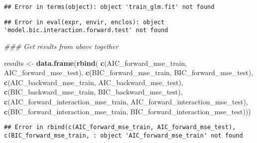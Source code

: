 \documentclass[]{article}
\newenvironment{Shaded}{\begin{snugshade}}{\end{snugshade}}
\newcommand{\CommentTok}[1]{\textcolor[rgb]{0.56,0.35,0.01}{\textit{#1}}}
\newcommand{\DataTypeTok}[1]{\textcolor[rgb]{0.13,0.29,0.53}{#1}}
\newcommand{\DecValTok}[1]{\textcolor[rgb]{0.00,0.00,0.81}{#1}}
\newcommand{\KeywordTok}[1]{\textcolor[rgb]{0.13,0.29,0.53}{\textbf{#1}}}
\newcommand{\NormalTok}[1]{#1}
\newcommand{\OperatorTok}[1]{\textcolor[rgb]{0.81,0.36,0.00}{\textbf{#1}}}
\newcommand{\StringTok}[1]{\textcolor[rgb]{0.31,0.60,0.02}{#1}}
\begin{document}
\begin{verbatim}
## Error in terms(object): object 'train_glm.fit' not found
\end{verbatim}

\begin{Shaded}
\end{Shaded}

\begin{verbatim}
## Error in eval(expr, envir, enclos): object 'model.bic.interaction.forward.test' not found
\end{verbatim}

\begin{Shaded}
\begin{Highlighting}[]
\CommentTok{### Get results from above together}

\NormalTok{results <-}\StringTok{ }\KeywordTok{data.frame}\NormalTok{(}\KeywordTok{rbind}\NormalTok{( }
                  \KeywordTok{c}\NormalTok{(AIC_forward_mse_train, AIC_forward_mse_test),}
                  \KeywordTok{c}\NormalTok{(BIC_forward_mse_train, BIC_forward_mse_test),}
                  \KeywordTok{c}\NormalTok{(AIC_backward_mse_train, AIC_backward_mse_test),}
                  \KeywordTok{c}\NormalTok{(BIC_backward_mse_train, BIC_backward_mse_test),}
                  \KeywordTok{c}\NormalTok{(AIC_forward_interaction_mse_train, AIC_forward_interaction_mse_test),}
                  \KeywordTok{c}\NormalTok{(BIC_forward_interaction_mse_train, BIC_forward_interaction_mse_test)))}
\end{Highlighting}
\end{Shaded}

\begin{verbatim}
## Error in rbind(c(AIC_forward_mse_train, AIC_forward_mse_test), c(BIC_forward_mse_train, : object 'AIC_forward_mse_train' not found
\end{verbatim}

\begin{Shaded}
\end{Shaded}
\end{document}
